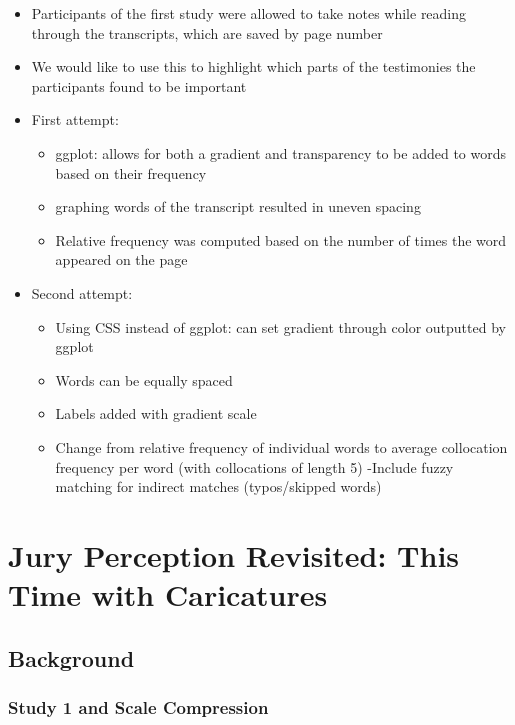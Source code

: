 \documentclass[print]{nuthesis}
\providecommand{\tightlist}{%
  \setlength{\itemsep}{0pt}\setlength{\parskip}{0pt}}
\begin{document}
\begin{itemize}
\item
  Participants of the first study were allowed to take notes while reading through the transcripts, which are saved by page number
\item
  We would like to use this to highlight which parts of the testimonies the participants found to be important
\item
  First attempt:

  \begin{itemize}
  \tightlist
  \item
    ggplot: allows for both a gradient and transparency to be added to words based on their frequency
  \item
    graphing words of the transcript resulted in uneven spacing
  \item
    Relative frequency was computed based on the number of times the word appeared on the page
  \end{itemize}
\item
  Second attempt:

  \begin{itemize}
  \tightlist
  \item
    Using CSS instead of ggplot: can set gradient through color outputted by ggplot
  \item
    Words can be equally spaced
  \item
    Labels added with gradient scale
  \item
    Change from relative frequency of individual words to average collocation frequency per word (with collocations of length 5)
    -Include fuzzy matching for indirect matches (typos/skipped words)
  \end{itemize}
\end{itemize}

\hypertarget{study2}{%
\chapter{Jury Perception Revisited: This Time with Caricatures}\label{study2}}

\hypertarget{background-2}{%
\section{Background}\label{background-2}}

\hypertarget{study-1-and-scale-compression}{%
\subsection{Study 1 and Scale Compression}\label{study-1-and-scale-compression}}
\end{document}
